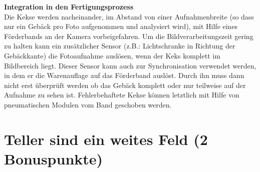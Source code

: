 \documentclass{ezb}
\begin{document}
\newline
\textbf{{\large Integration in den Fertigungsprozess}}\\
\newline
Die Kekse werden nacheinander, im Abstand von einer Aufnahmenbreite (so dass nur ein Gebäck pro Foto aufgenommen und analysiert wird), mit Hilfe eines Förderbands an der Kamera vorbeigefahren. Um die Bildverarbeitungszeit gering zu halten kann ein zusätzlicher Sensor (z.B.: Lichtschranke in Richtung der Gebäckkante) die Fotoaufnahme auslösen, wenn der Keks komplett im Bildbereich liegt. Dieser Sensor kann auch zur Synchronisation verwendet werden, in dem er die Warenauflage auf das Förderband auslöst. Durch ihn muss dann nicht erst überprüft werden ob das Gebäck komplett oder nur teilweise auf der Aufnahme zu sehen ist. Fehlerbehaftete Kekse können letztlich mit Hilfe von pneumatischen Modulen vom Band geschoben werden.
\newpage
\section{Teller sind ein weites Feld (2 Bonuspunkte)}




\end{document}
